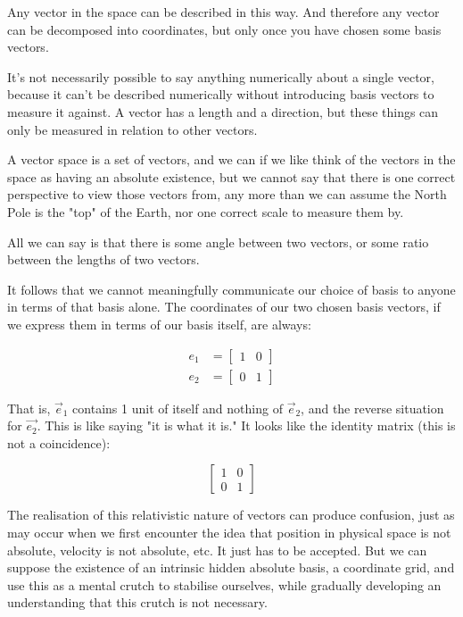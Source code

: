 Any vector in the space can be described in this way. And therefore any vector can be decomposed into coordinates, but only once you have chosen some basis vectors.

It's not necessarily possible to say anything numerically about a single vector, because it can't be described numerically without introducing basis vectors to measure it against. A vector has a length and a direction, but these things can only be measured in relation to other vectors.

A vector space is a set of vectors, and we can if we like think of the vectors in the space as having an absolute existence, but we cannot say that there is one correct perspective to view those vectors from, any more than we can assume the North Pole is the "top" of the Earth, nor one correct scale to measure them by.

All we can say is that there is some angle between two vectors, or some ratio between the lengths of two vectors.

It follows that we cannot meaningfully communicate our choice of basis to anyone in terms of that basis alone. The coordinates of our two chosen basis vectors, if we express them in terms of our basis itself, are always:

\begin{equation}   
    \begin{split}
        e_1 &= \begin{bmatrix}1 & 0\end{bmatrix} \\
        e_2 &= \begin{bmatrix}0 & 1\end{bmatrix}
    \end{split}
\end{equation}

That is, $\vec{e}_1$ contains 1 unit of itself and nothing of $\vec{e}_2$, and the reverse situation for $\vec{e_2}$. This is like saying "it is what it is." It looks like the identity matrix (this is not a coincidence):

$$
\begin{bmatrix}1 & 0 \\ 0 & 1\end{bmatrix}
$$

The realisation of this relativistic nature of vectors can produce confusion, just as may occur when we first encounter the idea that position in physical space is not absolute, velocity is not absolute, etc. It just has to be accepted. But we can suppose the existence of an intrinsic hidden absolute basis, a coordinate grid, and use this as a mental crutch to stabilise ourselves, while gradually developing an understanding that this crutch is not necessary.

